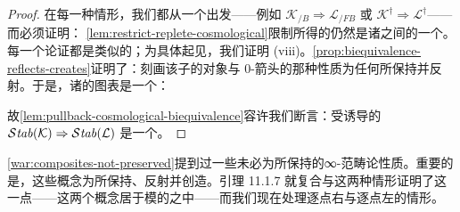 \begin{proof}
在每一种情形，我们都从一个\trCosmologicalBiequivalence{}出发——例如
$\mathcal{K}_{/B}\Rightarrow\mathcal{L}_{/FB}$ 或
$\mathcal{K}^{\dagger}\Rightarrow\mathcal{L}^{\dagger}$——而必须证明：%
\cref{lem:restrict-replete-cosmological}限制所得的\trCosmologicalFunctor{}仍然是诸\trCosmologicallyEmbedded{}\trInfinityCosmos{}之间的一个\trBiequivalence。每一个论证都是类似的；为具体起见，我们证明 (viii)。\cref{prop:biequivalence-reflects-creates}证明了：刻画该子\trInfinityCosmos{}的对象与 0-箭头的那种性质为任何\trBiequivalence{}所保持并反射。于是，诸\trCosmologicalFunctor{}的图表是一个\trPullback：
\begin{center}
\end{center}
故\cref{lem:pullback-cosmological-biequivalence}容许我们断言：受诱导的\trFunctor{} $\mathcal{S}\mathit{tab}(\mathcal{K})\Rightarrow\mathcal{S}\mathit{tab}(\mathcal{L})$ 是一个\trCosmologicalBiequivalence。
\end{proof}

\cref{war:composites-not-preserved}提到过一些未必为\trCosmologicalFunctor{}所保持的∞-范畴论性质。重要的是，这些概念为\trCosmologicalBiequivalence{}所保持、反射并创造。引理 11.1.7 就复合与\trExactSquare{}这两种情形证明了这一点——这两个概念居于模的\trVirtualEquipment{}之中——而我们现在处理逐点右\trExtension{}与逐点左\trExtension{}的情形。

